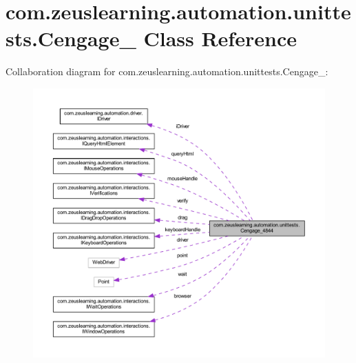 \hypertarget{classcom_1_1zeuslearning_1_1automation_1_1unittests_1_1Cengage__4844}{}\section{com.\+zeuslearning.\+automation.\+unittests.\+Cengage\+\_ Class Reference}
\label{classcom_1_1zeuslearning_1_1automation_1_1unittests_1_1Cengage__4844}


Collaboration diagram for com.\+zeuslearning.\+automation.\+unittests.\+Cengage\+\_\+:\nopagebreak
\begin{figure}[H]
\begin{center}
\leavevmode
\includegraphics[width=350pt]{de/dc7/classcom_1_1zeuslearning_1_1automation_1_1unittests_1_1Cengage__4844__coll__graph}
\end{center}
\end{figure}
